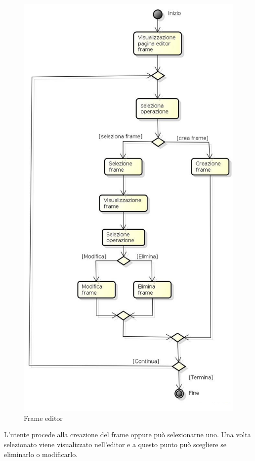 \begin{figure}[h!]
		\centering
		\includegraphics[scale=.2]{img/Editor_frame.jpg}
		\caption{Frame editor}
		\label{fig:ModelloSpy}
\end{figure}

L'utente procede alla creazione del frame oppure può selezionarne uno. Una volta selezionato viene visualizzato nell'editor e a questo punto può scegliere se eliminarlo o modificarlo.

